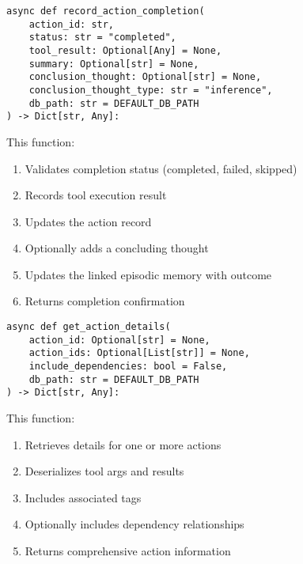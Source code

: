 \documentclass[12pt,a4paper]{article}
\begin{document}
\begin{pageablecode}
\begin{verbatim}
async def record_action_completion(
    action_id: str,
    status: str = "completed",
    tool_result: Optional[Any] = None,
    summary: Optional[str] = None,
    conclusion_thought: Optional[str] = None,
    conclusion_thought_type: str = "inference",
    db_path: str = DEFAULT_DB_PATH
) -> Dict[str, Any]:
\end{verbatim}
\end{pageablecode}
This function:
\begin{enumerate}[label=\arabic*.]
    \item Validates completion status (completed, failed, skipped)
    \item Records tool execution result
    \item Updates the action record
    \item Optionally adds a concluding thought
    \item Updates the linked episodic memory with outcome
    \item Returns completion confirmation
\end{enumerate}

\begin{pageablecode}
\begin{verbatim}
async def get_action_details(
    action_id: Optional[str] = None,
    action_ids: Optional[List[str]] = None,
    include_dependencies: bool = False,
    db_path: str = DEFAULT_DB_PATH
) -> Dict[str, Any]:
\end{verbatim}
\end{pageablecode}
This function:
\begin{enumerate}[label=\arabic*.]
    \item Retrieves details for one or more actions
    \item Deserializes tool args and results
    \item Includes associated tags
    \item Optionally includes dependency relationships
    \item Returns comprehensive action information
\end{enumerate}
\end{document}
